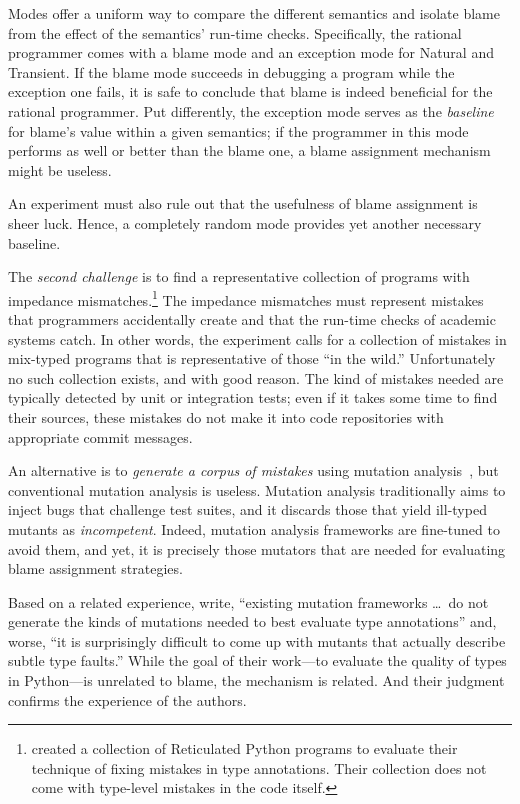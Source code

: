 Modes offer a uniform way to compare the different semantics and isolate blame
from the effect of the semantics' run-time checks. Specifically, the rational
programmer comes with a blame mode and an exception mode for Natural and
Transient. If the blame mode succeeds in debugging a program while the exception
one fails, it is safe to conclude that blame is indeed beneficial for the
rational programmer. Put differently, the exception mode serves as the {\em
baseline\/} for blame's value within a given semantics; if the programmer in
this mode performs as well or better than the blame one, a blame assignment
mechanism might be useless.

An experiment must also rule out that the usefulness of blame assignment is sheer
luck.  Hence, a completely random mode provides yet another necessary baseline.

The {\em second challenge\/} is to find a representative collection of programs
with impedance mismatches.\footnote{\citet{cc-oopsla-20} created a collection of
Reticulated Python programs to evaluate their technique of fixing mistakes in
type annotations. Their collection does not come with type-level mistakes in the
code itself.}  The impedance mismatches must represent mistakes that programmers accidentally
create and that the run-time checks of academic systems catch. In other words,
the experiment calls for a collection of mistakes in mix-typed programs that is
representative of those ``in the wild.''  Unfortunately no such collection
exists, and with good reason. The kind of mistakes needed are typically detected
by unit or integration tests; even if it takes some time to find their sources,
these mistakes do not make it into code repositories with appropriate commit
messages.

An alternative is to {\em generate a corpus of 
mistakes \/} using mutation analysis~\citep{lipton1971fault, demillo1978hints,
jia2011analysis}, but conventional mutation analysis is useless.  Mutation
analysis traditionally aims to inject bugs that challenge test suites, and it
discards those that yield ill-typed mutants as \emph{incompetent}. Indeed,
mutation analysis frameworks are fine-tuned to avoid them, and yet, it is
precisely those mutators that are needed for evaluating blame assignment strategies.

Based on a related experience, \citet{gw-mutation} write,
``existing mutation frameworks \ldots\ do not generate the kinds of mutations
needed to best evaluate type annotations'' and, worse, ``it is surprisingly
difficult to come up with mutants that actually describe subtle type faults.''
While the goal of their work---to evaluate the quality of types in
Python---is unrelated to blame, the mechanism is related. And their
judgment confirms the experience of the authors. 

